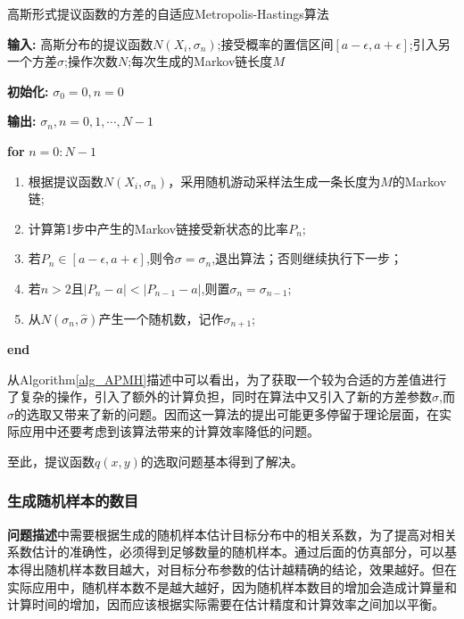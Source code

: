 \documentclass[11pt]{article}
\begin{document}
\begin{algorithm}[t] 
\caption{高斯形式提议函数的方差的自适应Metropolis-Hastings算法} 
\textbf{输入:} 高斯分布的提议函数$N(X_{i},\sigma_{n})$;接受概率的置信区间$[a-\epsilon,a+\epsilon]$;引入另一个方差$\hat{\sigma}$;操作次数$N$;每次生成的Markov链长度$M$

\textbf{初始化:} $\sigma_{0}=0,n=0$

\textbf{输出:} $\sigma_{n},n=0,1,\cdots,N-1$

\textbf{for} $n=0:N-1$ 

\begin{enumerate} 
  \item 根据提议函数$N(X_{i},\sigma_{n})$，采用随机游动采样法生成一条长度为$M$的Markov链;
  
  \item 计算第1步中产生的Markov链接受新状态的比率$P_{n}$;

  \item 若$P_{n}\in[a-\epsilon,a+\epsilon]$,则令$\sigma=\sigma_{n}$,退出算法；否则继续执行下一步；

  \item 若$n>2$且$\vert P_{n}-a\vert<\vert P_{n-1}-a\vert$,则置$\sigma_{n}=\sigma_{n-1}$;

  \item 从$N(\sigma_{n},\hat{\sigma})$产生一个随机数，记作$\sigma_{n+1}$;

\end{enumerate} 
\textbf{end} 
\label{alg_APMH} 
\end{algorithm}

从Algorithm\ref{alg_APMH}描述中可以看出，为了获取一个较为合适的方差值进行了复杂的操作，引入了额外的计算负担，同时在算法中又引入了新的方差参数$\hat{\sigma}$,而$\hat{\sigma}$的选取又带来了新的问题。因而这一算法的提出可能更多停留于理论层面，在实际应用中还要考虑到该算法带来的计算效率降低的问题。

至此，提议函数$q(x,y)$的选取问题基本得到了解决。

\subsubsection{生成随机样本的数目}
\textbf{问题描述}中需要根据生成的随机样本估计目标分布中的相关系数，为了提高对相关系数估计的准确性，必须得到足够数量的随机样本。通过后面的仿真部分，可以基本得出随机样本数目越大，对目标分布参数的估计越精确的结论，效果越好。但在实际应用中，随机样本数不是越大越好，因为随机样本数目的增加会造成计算量和计算时间的增加，因而应该根据实际需要在估计精度和计算效率之间加以平衡。
\end{document}
